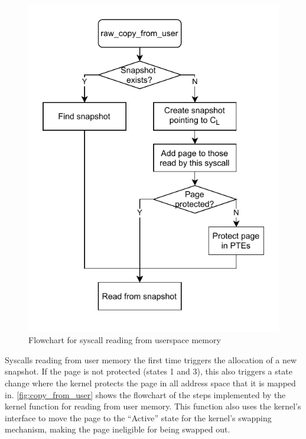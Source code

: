 \documentclass[letterpaper,twocolumn,10pt, anonymous]{article}
\begin{document}
\begin{figure}[]
  \centering
  \includegraphics[width=0.8\linewidth]{img/copy_from_user.pdf}
  \caption{Flowchart for syscall reading from userspace memory}
  \label{fig:copy_from_user}
\end{figure}

Syscalls reading from user memory the first time triggers the 
allocation of a new snapshot. 
If the page is not protected (states 1 and 3), this also 
triggers a state change where the kernel protects the page
in all address space that it is mapped in. 
\autoref{fig:copy_from_user} shows the flowchart of the steps
implemented by the kernel function  for 
reading from user memory.
This function also uses the kernel's  
interface to move the page to the ``Active'' state for the 
kernel's swapping mechanism, making the page ineligible for being 
swapped out. 
\end{document}
